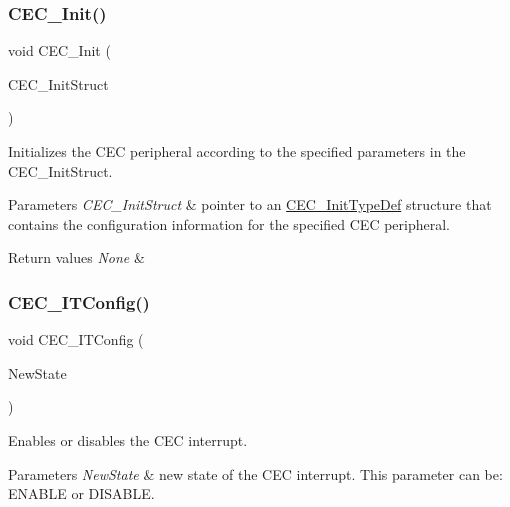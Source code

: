 \subsubsection{\texorpdfstring{CEC\_Init()}{CEC\_Init()}}
{\footnotesize\ttfamily void C\+E\+C\+\_\+\+Init (\begin{DoxyParamCaption}\item[{\mbox{\hyperlink{struct_c_e_c___init_type_def}{C\+E\+C\+\_\+\+Init\+Type\+Def}} $\ast$}]{C\+E\+C\+\_\+\+Init\+Struct }\end{DoxyParamCaption})}



Initializes the C\+EC peripheral according to the specified parameters in the C\+E\+C\+\_\+\+Init\+Struct. 


\begin{DoxyParams}{Parameters}
{\em C\+E\+C\+\_\+\+Init\+Struct} & pointer to an \mbox{\hyperlink{struct_c_e_c___init_type_def}{C\+E\+C\+\_\+\+Init\+Type\+Def}} structure that contains the configuration information for the specified C\+EC peripheral. \\
\hline
\end{DoxyParams}

\begin{DoxyRetVals}{Return values}
{\em None} & \\
\hline
\end{DoxyRetVals}
\mbox{\label{group___c_e_c___private___functions_ga8be87c514505cf82eb29334f054fc0bc}} 
\subsubsection{\texorpdfstring{CEC\_ITConfig()}{CEC\_ITConfig()}}
{\footnotesize\ttfamily void C\+E\+C\+\_\+\+I\+T\+Config (\begin{DoxyParamCaption}\item[{\mbox{\hyperlink{group___exported__types_gac9a7e9a35d2513ec15c3b537aaa4fba1}{Functional\+State}}}]{New\+State }\end{DoxyParamCaption})}



Enables or disables the C\+EC interrupt. 


\begin{DoxyParams}{Parameters}
{\em New\+State} & new state of the C\+EC interrupt. This parameter can be\+: E\+N\+A\+B\+LE or D\+I\+S\+A\+B\+LE. \\
\hline
\end{DoxyParams}


